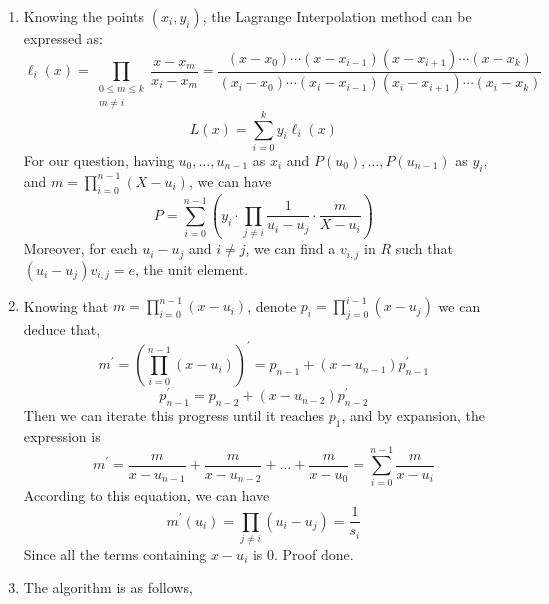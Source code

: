 \documentclass[12pt, a4paper]{article}
\begin{document}
\begin{enumerate}
    \item Knowing the points $(x_i, y_i)$, the Lagrange Interpolation method can be expressed as:
          \[
            \ell_i(x) = \prod_{\begin{smallmatrix} 0\leq m\leq k\\ m \neq i \end{smallmatrix}} \frac{x - x_m}{x_i - x_m} = 
            \frac{(x - x_0)\cdots (x - x_{i-1})(x - x_{i+1})\cdots (x - x_k)}{(x_i - x_0)\cdots (x_i - x_{i-1})(x_i - x_{i+1})\cdots (x_i - x_k)}
          \]
          \[L(x) = \sum_{i=0}^k y_i \ell_i(x)\]
          For our question, having $u_0, \dots, u_{n-1}$ as $x_i$ and $P(u_0), \dots, P(u_{n-1})$ as $y_i$, 
          and $m = \prod_{i=0}^{n-1}(X - u_i)$, we can have
          \[P = \sum_{i=0}^{n-1}(y_i\cdot \prod_{j\neq i}\frac{1}{u_i - u_j}\cdot \frac{m}{X - u_i})\]
          Moreover, for each $u_i - u_j$ and $i \neq j$, we can find a $v_{i, j}$ in $R$ such that $(u_i - u_j)v_{i, j} = e$, 
          the unit element.
    \item Knowing that $m = \prod_{i=0}^{n-1}(x - u_i)$, denote $p_i = \prod_{j=0}^{i-1}(x - u_j)$ we can deduce that,
          \[m^\prime = (\prod_{i=0}^{n-1}(x - u_i))^\prime = p_{n-1} + (x - u_{n-1})p_{n-1}^\prime\]
          \[p_{n-1}^\prime = p_{n-2} + (x - u_{n-2})p_{n-2}^\prime\]
          Then we can iterate this progress until it reaches $p_1$, and by expansion, the expression is 
          \[m^\prime = \frac{m}{x - u_{n-1}} + \frac{m}{x - u_{n-2}} + \dots + \frac{m}{x - u_0} = \sum_{i=0}^{n-1}\frac{m}{x - u_i}\]
          According to this equation, we can have
          \[m^\prime(u_i) = \prod_{j\neq i}(u_i - u_j) = \frac{1}{s_i}\]
          Since all the terms containing $x - u_i$ is 0.
          Proof done.
    \item The algorithm is as follows,
    

\end{enumerate}
\end{document}
